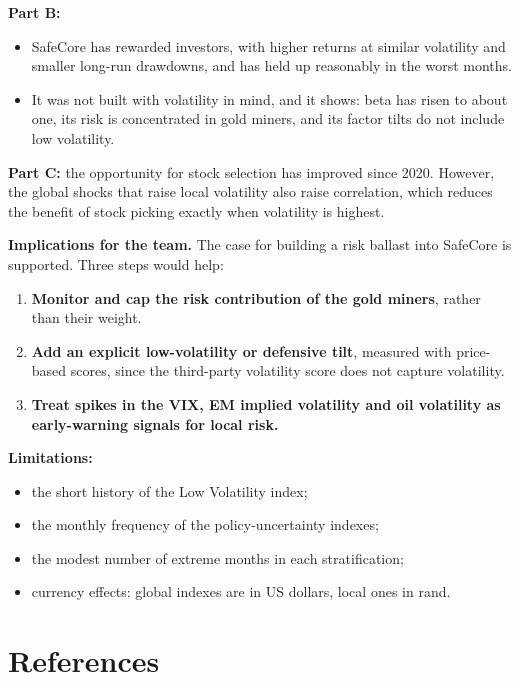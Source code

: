 \documentclass[11pt,preprint]{elsarticle}
\numberwithin{equation}{section}
\numberwithin{figure}{section}
\numberwithin{table}{section}
\def\tightlist{} %
\begin{document}
\textbf{Part B:}

\begin{itemize}
\tightlist
\item
  SafeCore has rewarded investors, with higher returns at similar
  volatility and smaller long-run drawdowns, and has held up reasonably
  in the worst months.
\item
  It was not built with volatility in mind, and it shows: beta has risen
  to about one, its risk is concentrated in gold miners, and its factor
  tilts do not include low volatility.
\end{itemize}

\textbf{Part C:} the opportunity for stock selection has improved since
2020. However, the global shocks that raise local volatility also raise
correlation, which reduces the benefit of stock picking exactly when
volatility is highest.

\textbf{Implications for the team.} The case for building a risk ballast
into SafeCore is supported. Three steps would help:

\begin{enumerate}
\def\labelenumi{\arabic{enumi}.}
\tightlist
\item
  \textbf{Monitor and cap the risk contribution of the gold miners},
  rather than their weight.
\item
  \textbf{Add an explicit low-volatility or defensive tilt}, measured
  with price-based scores, since the third-party volatility score does
  not capture volatility.
\item
  \textbf{Treat spikes in the VIX, EM implied volatility and oil
  volatility as early-warning signals for local risk.}
\end{enumerate}

\textbf{Limitations:}

\begin{itemize}
\tightlist
\item
  the short history of the Low Volatility index;
\item
  the monthly frequency of the policy-uncertainty indexes;
\item
  the modest number of extreme months in each stratification;
\item
  currency effects: global indexes are in US dollars, local ones in
  rand.
\end{itemize}

\newpage

\section*{References}\label{references}

\protect{}\label{refs}


\end{document}
